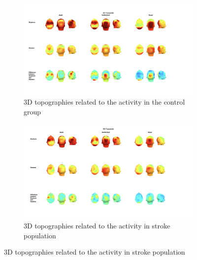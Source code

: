 \begin{figure}[htbp]
    \begin{subfigure}[htbp]{1.1\textwidth}
        \includegraphics[width=\textwidth]{healthy_images/3d_topo.png}
        \caption{3D topographies related to the activity in the control group}
        \label{fig: 3D topographies control group} 
    \end{subfigure}  
    \vfill
    \begin{subfigure}[htbp]{1.1\textwidth}
        \includegraphics[width=\textwidth]{stroke_images/3d_topographies.png}
        \caption{3D topographies related to the activity in stroke population}
        \label{fig: 3D topographies stroke group}   
    \end{subfigure}
\end{figure} 

\clearpage
